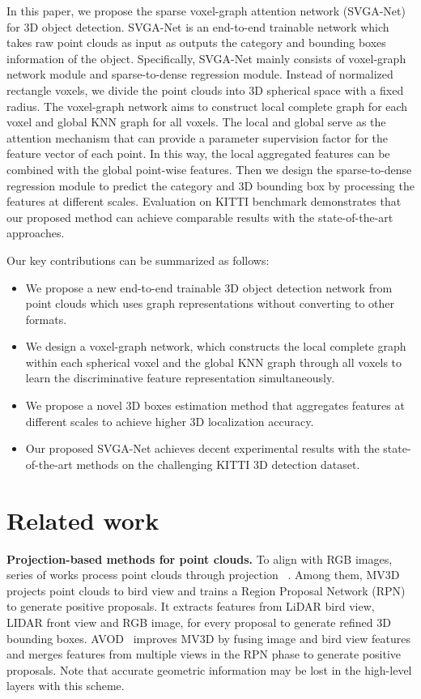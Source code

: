 \documentclass{article}
\begin{document}
In this paper, we propose the sparse voxel-graph attention network (SVGA-Net) for 3D object detection. SVGA-Net is an end-to-end trainable network which takes raw point clouds as input as outputs the category and bounding boxes information of the object. Specifically, SVGA-Net mainly consists of voxel-graph network module and sparse-to-dense regression module. Instead of normalized rectangle voxels, we divide the point clouds into 3D spherical space with a fixed radius. The voxel-graph network aims to construct local complete graph for each voxel and global KNN graph for all voxels. The local and global serve as the attention mechanism that can provide a parameter supervision factor for the feature vector of each point. In this way, the local aggregated features can be combined with the global point-wise features. Then we design the sparse-to-dense regression module to predict the category and 3D bounding box by processing the features at different scales. Evaluation on KITTI benchmark demonstrates that our proposed method can achieve comparable results with the state-of-the-art approaches.

Our key contributions can be summarized as follows:
\begin{itemize}
\item We propose a new end-to-end trainable 3D object detection network from point clouds which uses graph representations without converting to other formats.
\item We design a voxel-graph network, which constructs the local complete graph within each spherical voxel and the global KNN graph through all voxels to learn the discriminative feature representation simultaneously.
\item We propose a novel 3D boxes estimation method that aggregates features at different scales to achieve higher 3D localization accuracy.
\item Our proposed SVGA-Net achieves decent experimental results with the state-of-the-art methods on the challenging KITTI 3D detection dataset.
\end{itemize}

\section{Related work}
{\bf Projection-based methods for point clouds.} To align with RGB images, series of works process point clouds through projection ~\cite{chen2017multi,ku2018joint,liang2018deep,yang2018pixor,liang2019multi}. Among them, MV3D~\cite{chen2017multi} projects point clouds to bird view and trains a Region Proposal Network (RPN) to generate positive proposals. It extracts features from LiDAR bird view, LIDAR front view and RGB image, for every proposal to generate refined 3D bounding boxes. AVOD~\cite{ku2018joint} improves MV3D by fusing image and bird view features and merges features from multiple views in the RPN phase to generate positive proposals. Note that accurate geometric information may be lost in the high-level layers with this scheme.
\end{document}
